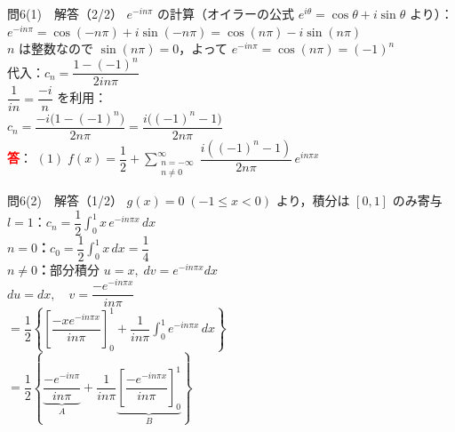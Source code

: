 \documentclass[professionalfonts]{beamer}
\begin{document}
\begin{frame}{問6(1)　解答（2/2）}
  $e^{-in\pi}$ の計算（オイラーの公式 $e^{i\theta}=\cos\theta+i\sin\theta$ より）：\\[4pt]
  $e^{-in\pi} = \cos(-n\pi)+i\sin(-n\pi) = \cos(n\pi)-i\sin(n\pi)$\\[2pt]
  $n$ は整数なので $\sin(n\pi)=0$，よって $e^{-in\pi} = \cos(n\pi) = (-1)^{n}$\\[6pt]
  代入：$c_{n} = \dfrac{1-(-1)^{n}}{2in\pi}$\\[6pt]
  $\dfrac{1}{in}=\dfrac{-i}{n}$ を利用：\\[2pt]
  $c_{n} = \dfrac{-i\bigl(1-(-1)^{n}\bigr)}{2n\pi} = \dfrac{i\bigl((-1)^{n}-1\bigr)}{2n\pi}$
  \\[8pt]\textcolor{red}{\textbf{答}}：
  $(1)\; f(x) = \dfrac{1}{2} + \displaystyle\sum_{\substack{n=-\infty \\ n\neq 0}}^{\infty} \dfrac{i((-1)^{n}-1)}{2n\pi}\,e^{in\pi x}$
\end{frame}

\begin{frame}{問6(2)　解答（1/2）}
  $g(x)=0\;(-1\leq x<0)$ より，積分は $[0,1]$ のみ寄与\\[4pt]
  $l=1$：$c_{n} = \dfrac{1}{2}\displaystyle\int_{0}^{1}x\,e^{-in\pi x}\,dx$\\[4pt]
  \textbf{$n=0$：}$c_{0} = \dfrac{1}{2}\displaystyle\int_{0}^{1}x\,dx = \dfrac{1}{4}$\\[4pt]
  \textbf{$n\neq 0$：}部分積分 $u=x,\;dv=e^{-in\pi x}dx$\\[2pt]
  \hspace{2em}$du=dx,\quad v=\dfrac{-e^{-in\pi x}}{in\pi}$\\[4pt]
  $= \dfrac{1}{2}\!\left\{\!\left[\dfrac{-xe^{-in\pi x}}{in\pi}\right]_{0}^{1}
    + \dfrac{1}{in\pi}\displaystyle\int_{0}^{1}e^{-in\pi x}\,dx\right\}$\\[4pt]
  $= \dfrac{1}{2}\!\left\{
      \underbrace{\dfrac{-e^{-in\pi}}{in\pi}}_{A}
      + \dfrac{1}{in\pi}\underbrace{\left[\dfrac{-e^{-in\pi x}}{in\pi}\right]_{0}^{1}}_{B}
    \right\}$
\end{frame}
\end{document}
